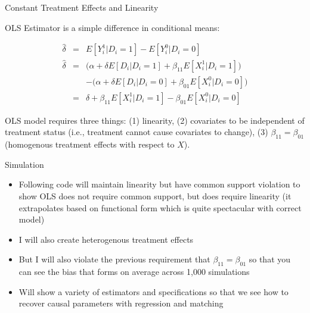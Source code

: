 \documentclass{beamer}
\begin{document}
\begin{frame}{Constant Treatment Effects and Linearity}

OLS Estimator is a simple difference in conditional means:

\begin{eqnarray*}
\widehat{\delta} &=& E[Y^1_i | D_i = 1]  - E[Y^0_i | D_i = 0]  \\
\widehat{\delta} &=& \bigg (\alpha + \delta E[D_i | D_i=1] + \beta_{11} E[X^1_i | D_i=1] \bigg ) \\
&& - \bigg (\alpha + \delta E[D_i | D_i=0] + \beta_{01} E[X^0_i | D_i=0] \bigg ) \\
&=& \delta + \beta_{11} E[X^1_i | D_i =1] - \beta_{01} E[X^0_i | D_i = 0] 
\end{eqnarray*}

\bigskip

OLS model requires three things: (1) linearity, (2) covariates to be independent of treatment status (i.e., treatment cannot cause covariates to change), (3) $\beta_{11}=\beta_{01}$ (homogenous treatment effects with respect to $X$).  

\end{frame}

\begin{frame}{Simulation}

\begin{itemize}

\item Following code will maintain linearity but have common support violation to show OLS does not require common support, but does require linearity (it extrapolates based on functional form which is quite spectacular with correct model)
\item I will also create heterogenous treatment effects 
\item But I will also violate the previous requirement that $\beta_{11}=\beta_{01}$ so that you can see the bias that forms on average across 1,000 simulations
\item Will show a variety of estimators and specifications so that we see how to recover causal parameters with regression and matching
\end{itemize}

\end{frame}
\end{document}
